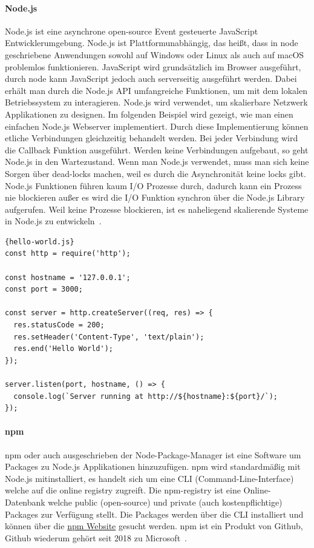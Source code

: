 \paragraph{Node.js}
\label{Node.js}
Node.js ist eine asynchrone open-source Event gesteuerte JavaScript Entwicklerumgebung.
Node.js ist Plattformunabhängig, das heißt, dass in node geschriebene Anwendungen sowohl auf Windows oder Linux als auch auf macOS problemlos funktionieren.
JavaScript wird grundsätzlich im Browser ausgeführt, durch node kann JavaScript jedoch auch serverseitig ausgeführt werden.
Dabei erhält man durch die Node.js API umfangreiche Funktionen, um mit dem lokalen Betriebssystem zu interagieren.
Node.js wird verwendet, um skalierbare Netzwerk Applikationen zu designen.
Im folgenden Beispiel wird gezeigt, wie man einen einfachen Node.js Webserver implementiert.
Durch diese Implementierung können etliche Verbindungen gleichzeitig behandelt werden.
Bei jeder Verbindung wird die Callback Funktion ausgeführt.
Werden keine Verbindungen aufgebaut, so geht Node.js in den Wartezustand.
Wenn man Node.js verwendet, muss man sich keine Sorgen über dead-locks machen, weil es durch die Asynchronität keine locks gibt.
Node.js Funktionen führen kaum I/O Prozesse durch,
dadurch kann ein Prozess nie blockieren außer es wird die I/O Funktion synchron über die Node.js Library aufgerufen.
Weil keine Prozesse blockieren, ist es naheliegend skalierende Systeme in Node.js zu entwickeln~\cite{about-node-js}.

\begin{lstlisting}[label={lst:hello-world.js}]{hello-world.js}
const http = require('http');

const hostname = '127.0.0.1';
const port = 3000;

const server = http.createServer((req, res) => {
  res.statusCode = 200;
  res.setHeader('Content-Type', 'text/plain');
  res.end('Hello World');
});

server.listen(port, hostname, () => {
  console.log(`Server running at http://${hostname}:${port}/`);
});
\end{lstlisting}

\paragraph{npm}
npm oder auch ausgeschrieben der Node-Package-Manager ist eine Software um Packages zu Node.js Applikationen hinzuzufügen.
npm wird standardmäßig mit Node.js mitinstalliert, es handelt sich um eine CLI (Command-Line-Interface) welche auf die online registry zugreift.
Die npm-registry ist eine Online-Datenbank welche public (open-source) und private (auch kostenpflichtige) Packages zur Verfügung stellt.
Die Packages werden über die CLI installiert und können über die \href{https://npmjs.com}{npm Website} gesucht werden.
npm ist ein Produkt von Github, Github wiederum gehört seit 2018 zu Microsoft~\cite{microsoft-acquires-github}.

